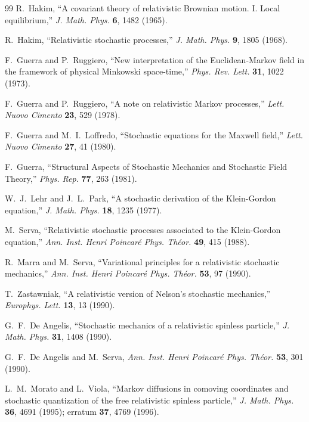 \documentclass[11pt]{article}
\begin{document}
\begin{thebibliography}{99}
 R.~Hakim, ``A covariant theory of relativistic Brownian motion. I. Local equilibrium,'' \emph{J. Math. Phys.} \textbf{6}, 1482 (1965).

 R.~Hakim, ``Relativistic stochastic processes,'' \emph{J. Math. Phys.} \textbf{9}, 1805 (1968).

 F.~Guerra and P.~Ruggiero, ``New interpretation of the Euclidean-Markov field in the framework of physical Minkowski space-time,'' \emph{Phys. Rev. Lett.} \textbf{31}, 1022 (1973).

 F.~Guerra and P.~Ruggiero, ``A note on relativistic Markov processes,'' \emph{Lett. Nuovo Cimento} \textbf{23}, 529 (1978).

 F.~Guerra and M.~I.~Loffredo, ``Stochastic equations for the Maxwell field,'' \emph{Lett. Nuovo Cimento} \textbf{27}, 41 (1980).

 F.~Guerra, ``Structural Aspects of Stochastic Mechanics and Stochastic Field Theory,'' \emph{Phys. Rep.} \textbf{77}, 263 (1981).

 W.~J.~Lehr and J.~L.~Park, ``A stochastic derivation of the Klein-Gordon equation,'' \emph{J. Math. Phys.} \textbf{18}, 1235 (1977).

 M.~Serva, ``Relativistic stochastic processes associated to the Klein-Gordon equation,'' \emph{Ann. Inst. Henri Poincaré Phys. Théor.} \textbf{49}, 415 (1988).

 R.~Marra and M.~Serva, ``Variational principles for a relativistic stochastic mechanics,'' \emph{Ann. Inst. Henri Poincaré Phys. Théor.} \textbf{53}, 97 (1990).

 T.~Zastawniak, ``A relativistic version of Nelson's stochastic mechanics,'' \emph{Europhys. Lett.} \textbf{13}, 13 (1990).

 G.~F.~De Angelis, ``Stochastic mechanics of a relativistic spinless particle,'' \emph{J. Math. Phys.} \textbf{31}, 1408 (1990).

 G.~F.~De Angelis and M.~Serva, \emph{Ann. Inst. Henri Poincaré Phys. Théor.} \textbf{53}, 301 (1990).

 L.~M.~Morato and L.~Viola, ``Markov diffusions in comoving coordinates and stochastic quantization of the free relativistic spinless particle,'' \emph{J. Math. Phys.} \textbf{36}, 4691 (1995); erratum \textbf{37}, 4769 (1996).


\end{thebibliography}
\end{document}
